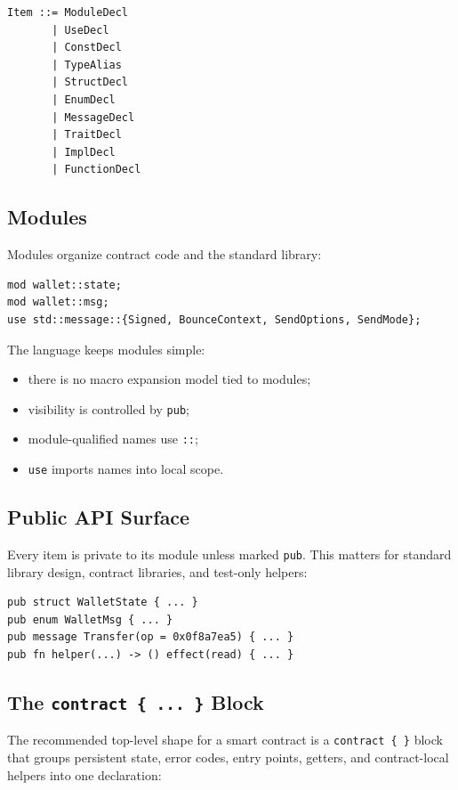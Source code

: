 \documentclass[12pt,oneside]{article}
\begin{document}
\begin{verbatim}
Item ::= ModuleDecl
       | UseDecl
       | ConstDecl
       | TypeAlias
       | StructDecl
       | EnumDecl
       | MessageDecl
       | TraitDecl
       | ImplDecl
       | FunctionDecl
\end{verbatim}

\subsection{Modules}
Modules organize contract code and the standard library:

\begin{verbatim}
mod wallet::state;
mod wallet::msg;
use std::message::{Signed, BounceContext, SendOptions, SendMode};
\end{verbatim}

The language keeps modules simple:

\begin{itemize}
\item there is no macro expansion model tied to modules;
\item visibility is controlled by \verb|pub|;
\item module-qualified names use \verb|::|;
\item \verb|use| imports names into local scope.
\end{itemize}

\subsection{Public API Surface}
Every item is private to its module unless marked \verb|pub|. This matters for
standard library design, contract libraries, and test-only helpers:

\begin{verbatim}
pub struct WalletState { ... }
pub enum WalletMsg { ... }
pub message Transfer(op = 0x0f8a7ea5) { ... }
pub fn helper(...) -> () effect(read) { ... }
\end{verbatim}

\subsection{The \texttt{contract \{ ... \}} Block}
\label{sec:contract-block}
The recommended top-level shape for a smart contract is a
\verb|contract { }| block that groups persistent state, error codes,
entry points, getters, and contract-local helpers into one declaration:
\end{document}

